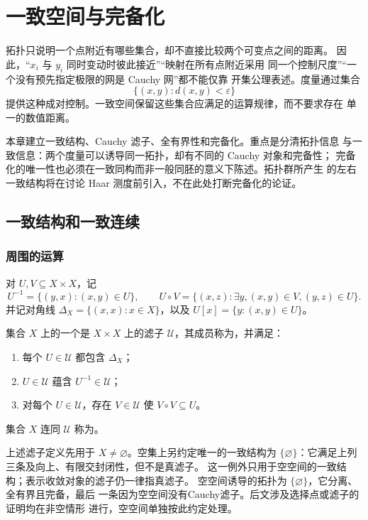\chapter{一致空间与完备化}
\label{chap:uniform-spaces}

拓扑只说明一个点附近有哪些集合，却不直接比较两个可变点之间的距离。
因此，“\(x_i\) 与 \(y_i\) 同时变动时彼此接近”“映射在所有点附近采用
同一个控制尺度”“一个没有预先指定极限的网是 Cauchy 网”都不能仅靠
开集公理表述。度量通过集合
\[
 \{(x,y):d(x,y)<\varepsilon\}
\]
提供这种成对控制。一致空间保留这些集合应满足的运算规律，而不要求存在
单一的数值距离。

本章建立一致结构、Cauchy 滤子、全有界性和完备化。重点是分清拓扑信息
与一致信息：两个度量可以诱导同一拓扑，却有不同的 Cauchy 对象和完备性；
完备化的唯一性也必须在一致同构而非一般同胚的意义下陈述。拓扑群所产生
的左右一致结构将在讨论 Haar 测度前引入，不在此处打断完备化的论证。

\section{一致结构和一致连续}

\subsection{周围的运算}

对 \(U,V\subseteq X\times X\)，记
\[
 U^{-1}=\{(y,x):(x,y)\in U\},\qquad
 U\circ V=\{(x,z):\exists y, (x,y)\in V, (y,z)\in U\}.
\]
并记对角线 \(\Delta_X=\{(x,x):x\in X\}\)，以及
\(U[x]=\{y:(x,y)\in U\}\)。

\begin{definition}[一致结构]
集合 \(X\) 上的一个是 \(X\times X\) 上的滤子
\(\mathcal U\)，其成员称为，并满足：
\begin{enumerate}[label=\textup{(\roman*)}]
 \item 每个 \(U\in\mathcal U\) 都包含 \(\Delta_X\)；
 \item \(U\in\mathcal U\) 蕴含 \(U^{-1}\in\mathcal U\)；
 \item 对每个 \(U\in\mathcal U\)，存在 \(V\in\mathcal U\) 使
 \(V\circ V\subseteq U\)。
\end{enumerate}
集合 \(X\) 连同 \(\mathcal U\) 称为。
\end{definition}

上述滤子定义先用于 \(X\ne\varnothing\)。空集上另约定唯一的一致结构为
\(\{\varnothing\}\)：它满足上列三条及向上、有限交封闭性，但不是真滤子。
这一例外只用于空空间的一致结构；表示收敛对象的滤子仍一律指真滤子。
空空间诱导的拓扑为 \(\{\varnothing\}\)，它分离、全有界且完备，最后
一条因为空空间没有Cauchy滤子。后文涉及选择点或滤子的证明均在非空情形
进行，空空间单独按此约定处理。


